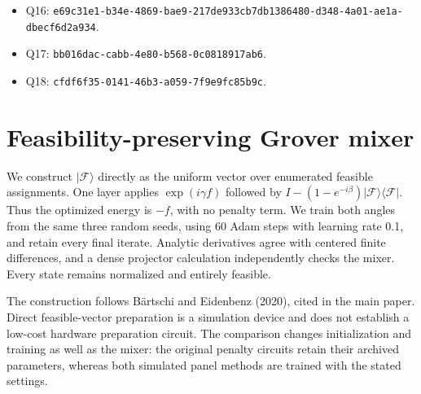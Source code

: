 \begin{itemize}
\item Q16: \texttt{e69c31e1-b34e-4869-bae9-217de933cb7d}\newline \texttt{b1386480-d348-4a01-ae1a-dbecf6d2a934}.

\item Q17: \texttt{bb016dac-cabb-4e80-b568-0c0818917ab6}.

\item Q18: \texttt{cfdf6f35-0141-46b3-a059-7f9e9fc85b9c}.

\end{itemize}

\clearpage
\section{Feasibility-preserving Grover mixer}
We construct $|\mathcal F\rangle$ directly as the uniform vector over enumerated feasible assignments. One layer applies $\exp(i\gamma f)$ followed by $I-(1-e^{-i\beta})|\mathcal F\rangle\langle\mathcal F|$. Thus the optimized energy is $-f$, with no penalty term. We train both angles from the same three random seeds, using 60 Adam steps with learning rate 0.1, and retain every final iterate. Analytic derivatives agree with centered finite differences, and a dense projector calculation independently checks the mixer. Every state remains normalized and entirely feasible.

The construction follows B{\"a}rtschi and Eidenbenz (2020), cited in the main paper. Direct feasible-vector preparation is a simulation device and does not establish a low-cost hardware preparation circuit. The comparison changes initialization and training as well as the mixer: the original penalty circuits retain their archived parameters, whereas both simulated panel methods are trained with the stated settings.

